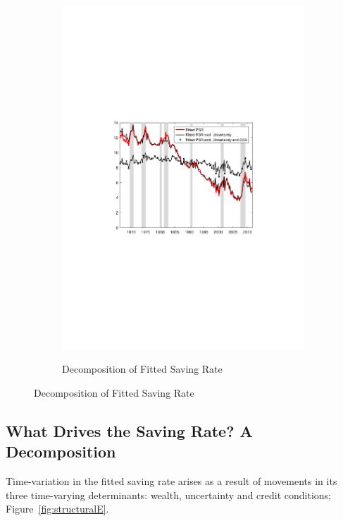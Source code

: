 \documentclass[titlepage]{\econtex}
\begin{document}
\begin{figure}
\begin{subfigure}[t]{0.49\textheight}
		{\includegraphics[width=0.475\textheight]{./Figures/fPSR_StructDecomp}}
		\caption{Decomposition of Fitted Saving Rate}\label{fPSR_StructDecomp}
	\end{subfigure}
\end{figure}



\subsection{What Drives the Saving Rate? A Decomposition}

Time-variation in the fitted saving rate arises as a result of movements in its three time-varying determinants: wealth, uncertainty and credit conditions; Figure~\ref{fig:structuralE}.
\end{document}
